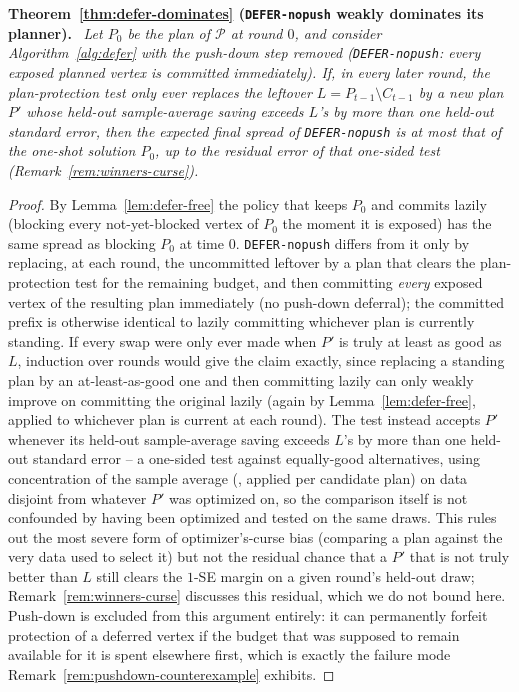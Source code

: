 \documentclass[ASNA,number]{USG}
\newenvironment{repeattheorem}[1][]{\par\medskip\noindent\textbf{#1.}\ \itshape}{\par\medskip}
\begin{document}
\begin{repeattheorem}[Theorem~\ref{thm:defer-dominates} (\texttt{DEFER-nopush} weakly dominates its planner)]
Let $P_0$ be the plan of $\mathcal P$ at round $0$, and consider
Algorithm~\ref{alg:defer} with the push-down step removed
(\texttt{DEFER-nopush}: every exposed planned vertex is committed
immediately). If, in every later round, the plan-protection test only ever
replaces the leftover $L=P_{t-1}\setminus C_{t-1}$ by a new plan $P'$
whose held-out sample-average saving exceeds $L$'s by more than one
held-out standard error, then the expected final spread of
\texttt{DEFER-nopush} is at most that of the one-shot solution $P_0$, up to
the residual error of that one-sided test (Remark~\ref{rem:winners-curse}).
\end{repeattheorem}
\begin{proof}
By Lemma~\ref{lem:defer-free} the policy that keeps $P_0$ and commits
lazily (blocking every not-yet-blocked vertex of $P_0$ the moment it is
exposed) has the same spread as blocking $P_0$ at time $0$.
\texttt{DEFER-nopush} differs from it only by replacing, at each round,
the uncommitted leftover by a plan that clears the plan-protection test
for the remaining budget, and then committing \emph{every} exposed vertex
of the resulting plan immediately (no push-down deferral); the committed
prefix is otherwise identical to lazily committing whichever plan is
currently standing. If every swap were only ever made when $P'$ is truly
at least as good as $L$, induction over rounds would give the claim
exactly, since replacing a standing plan by an at-least-as-good one and
then committing lazily can only weakly improve on committing the original
lazily (again by Lemma~\ref{lem:defer-free}, applied to whichever plan is
current at each round). The test instead accepts $P'$ whenever its
held-out sample-average saving exceeds $L$'s by more than one held-out
standard error -- a one-sided test against equally-good alternatives,
using concentration of the sample average (\citealp{xie2024}, applied per
candidate plan) on data disjoint from whatever $P'$ was optimized on, so
the comparison itself is not confounded by having been optimized and
tested on the same draws. This rules out the most severe form of
optimizer's-curse bias (comparing a plan against the very data used to
select it) but not the residual chance that a $P'$ that is not truly
better than $L$ still clears the $1$-SE margin on a given round's held-out
draw; Remark~\ref{rem:winners-curse} discusses this residual, which we do
not bound here. Push-down is excluded from this argument entirely: it can
permanently forfeit protection of a deferred vertex if the budget that was
supposed to remain available for it is spent elsewhere first, which is
exactly the failure mode Remark~\ref{rem:pushdown-counterexample}
exhibits.
\end{proof}
\end{document}
